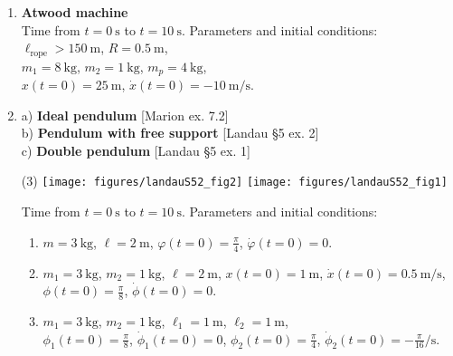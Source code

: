 \documentclass[11pt, a4paper, twoside]{article}
\begin{document}
\begin{enumerate}


\item 
\begin{minipage}[t][2.5cm]{0.7\textwidth}
\textbf{Atwood machine}\\
Time from \(t = \SI{0}{\second}\) to \(t = \SI{10}{\second}\).
Parameters and initial conditions:\\
\(\ell_\mathrm{rope} > \SI{150}{\metre}\), 
\(R = \SI{0.5}{\metre}\), \\ 
\(m_1 = \SI{8}{\kilo\gram}\), 
\(m_2 = \SI{1}{\kilo\gram}\), 
\(m_p = \SI{4}{\kilo\gram}\), \\
\(x(t=0) = \SI{25}{\metre}\), 
\(\dot{x}(t=0) = -\SI{10}{\metre\per\second}\).
\end{minipage}
\begin{minipage}[c][2cm][t]{0.3\textwidth}
	
\end{minipage}

\item
	a) \textbf{Ideal pendulum} [Marion ex. 7.2] \\
	b) \textbf{Pendulum with free support} [Landau \S5 ex. 2]\\ 
	c) \textbf{Double pendulum} [Landau \S5 ex. 1] 
\begin{tasks}(3)
	\task 
	\task \texttt{[image: figures/landauS52\_fig2]}
	\task \texttt{[image: figures/landauS52\_fig1]}
\end{tasks}
Time from \(t = \SI{0}{\second}\) to \(t = \SI{10}{\second}\). Parameters and initial conditions:
\begin{enumerate}
	\item \(m = \SI{3}{\kilo\gram}\), 
				\(\ell = \SI{2}{\metre}\), 
				\(\varphi (t=0) = \frac{\pi}{4}\), \(\dot{\varphi} (t=0) = 0\).
	\item \(m_1 = \SI{3}{\kilo\gram}\), \(m_2 = \SI{1}{\kilo\gram}\),   
				\(\ell = \SI{2}{\metre}\), 
				\(x(t=0) = \SI{1}{\metre}\), \(\dot{x} (t=0) = \SI{0.5}{\metre\per\second} \),
				\(\phi (t=0) = \frac{\pi}{8}\), \(\dot{\phi} (t=0) = 0\).
	\item \(m_1 = \SI{3}{\kilo\gram}\), \(m_2 = \SI{1}{\kilo\gram}\),
				\(\ell_1 = \SI{1}{\metre}\), \(\ell_2 = \SI{1}{\metre}\),\\ 
				\(\phi_1 (t=0) = \frac{\pi}{8}\), \(\dot{\phi}_1 (t=0) = 0\), 
				\(\phi_2 (t=0) = \frac{\pi}{4}\), \(\dot{\phi}_2 (t=0) = -\frac{\pi}{16} \si{\per\second}\).
\end{enumerate}



\end{enumerate}
\end{document}
